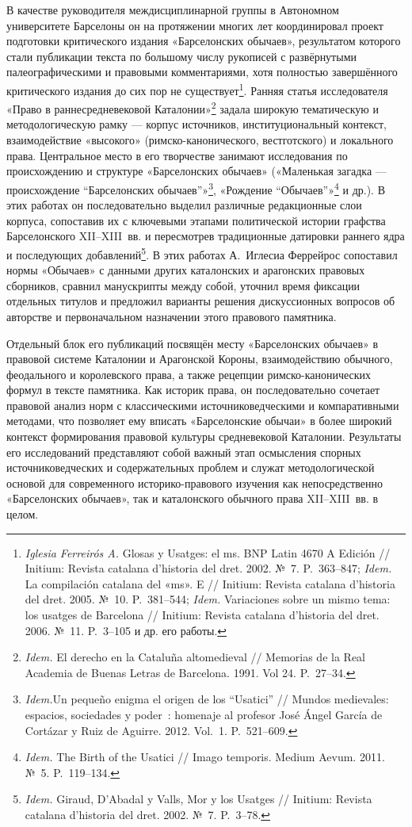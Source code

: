 В качестве руководителя междисциплинарной группы в Автономном университете Барселоны он на протяжении многих лет координировал проект подготовки критического издания «Барселонских обычаев», результатом которого стали публикации текста по большому числу рукописей с развёрнутыми палеографическими и правовыми комментариями, хотя полностью завершённого критического издания до сих пор не существует\footnote{\emph{Iglesia Ferreirós A.} Glosas y Usatges: el ms. BNP Latin 4670 A Edición // Initium: Revista catalana d’historia del dret. 2002. №~7. P.~363--847; \emph{Idem.} La compilación catalana del «ms». E // Initium: Revista catalana d’historia del dret. 2005. №~10. P.~381--544; \emph{Idem. }Variaciones sobre un mismo tema: los usatges de Barcelona // Initium: Revista catalana d’historia del dret. 2006. №~11. P.~3--105 и др. его работы.}. Ранняя статья исследователя «Право в раннесредневековой Каталонии»\footnote{\emph{Idem.} El derecho en la Cataluña altomedieval // Memorias de la Real Academia de Buenas Letras de Barcelona. 1991. Vol 24. P.~27--34.} задала широкую тематическую и методологическую рамку --- корпус источников, институциональный контекст, взаимодействие «высокого» (римско-канонического, вестготского) и локального права. Центральное место в его творчестве занимают исследования по происхождению и структуре «Барселонских обычаев» («Маленькая загадка --- происхождение “Барселонских обычаев”»\footnote{\emph{I}\emph{dem.}Un pequeño enigma el origen de los “Usatici” // Mundos medievales: espacios, sociedades y poder~: homenaje al profesor José Ángel García de Cortázar y Ruiz de Aguirre. 2012. Vol.~1. P.~521--609.}, «Рождение “Обычаев”»\footnote{\emph{Idem.} The Birth of the Usatici // Imago temporis. Medium Aevum. 2011. №~5. P.~119--134.} и др.). В этих работах он последовательно выделил различные редакционные слои корпуса, сопоставив их с ключевыми этапами политической истории графства Барселонского XII--XIII~вв. и пересмотрев традиционные датировки раннего ядра и последующих добавлений\footnote{\emph{Idem.} Giraud, D’Abadal y Valls, Mor y los Usatges // Initium: Revista catalana d’historia del dret. 2002. №~7. P.~3--78.}. В этих работах А.~Иглесиа Феррейрос сопоставил нормы «Обычаев» с данными других каталонских и арагонских правовых сборников, сравнил манускрипты между собой, уточнил время фиксации отдельных титулов и предложил варианты решения дискуссионных вопросов об авторстве и первоначальном назначении этого правового памятника.

Отдельный блок его публикаций посвящён месту «Барселонских обычаев» в правовой системе Каталонии и Арагонской Короны, взаимодействию обычного, феодального и королевского права, а также рецепции римско-канонических формул в тексте памятника. Как историк права, он последовательно сочетает правовой анализ норм с классическими источниковедческими и компаративными методами, что позволяет ему вписать «Барселонские обычаи» в более широкий контекст формирования правовой культуры средневековой Каталонии. Результаты его исследований представляют собой важный этап осмысления спорных источниковедческих и содержательных проблем и служат методологической основой для современного историко-правового изучения как непосредственно «Барселонских обычаев», так и каталонского обычного права XII--XIII~вв. в целом.

